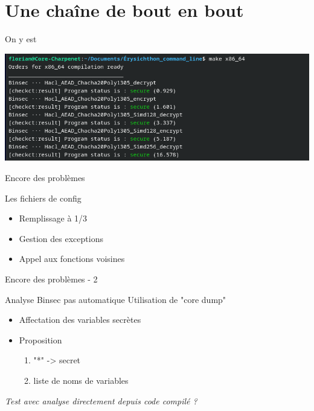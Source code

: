 \documentclass[A4,svgnames,9pt,aspectratio=169]{beamer}
\begin{document}

\section{Une chaîne de bout en bout}
\frame{\sectionpage}

\begin{frame}{On y est}

  \begin{center}
    \includegraphics[trim={0 0 2cm 0},clip,scale=0.5]{imgs/reussite.png}
  \end{center}

\end{frame}


\begin{frame}{Encore des problèmes}

  \begin{block}{Les fichiers de config}
    \begin{itemize}
      \item Remplissage à 1/3
      \item Gestion des exceptions
      \item Appel aux fonctions voisines
    \end{itemize}
  \end{block}
\end{frame}


\begin{frame}{Encore des problèmes - 2}

  \begin{block}{Analyse Binsec pas automatique}
    Utilisation de "core dump"
    \begin{itemize}
      \item Affectation des variables secrètes
      \item Proposition
      \begin{enumerate}
        \item "*" -> secret
        \item liste de noms de variables
      \end{enumerate}
    \end{itemize}
  \end{block}
  \textit{Test avec analyse directement depuis code compilé ?}
\end{frame}
\end{document}
